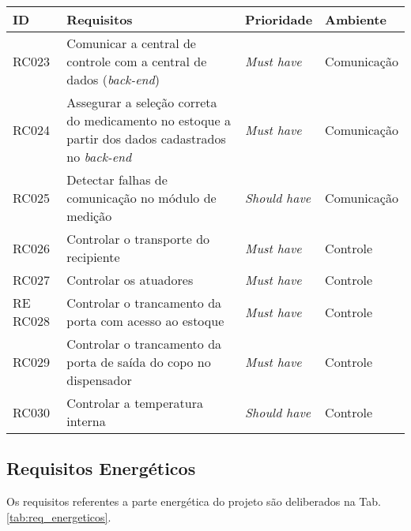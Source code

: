 \begin{table}[H]
    \centering
	\begin{adjustbox}{max width = \textwidth}
        \begin{tabular}{|L{1.5cm}|L{8.5cm}|C{2.5cm}|C{3.5cm}|}
        \hline
        \textbf{ID} & \textbf{Requisitos} & \textbf{Prioridade} & \textbf{Ambiente} \\ \hline
        RC023 & Comunicar a  central de controle com a central de dados (\textit{back-end}) & \textit{Must have} & Comunicação\\ \hline
        RC024 & Assegurar a seleção correta do medicamento no estoque a partir dos dados cadastrados no \textit{back-end} & \textit{Must have} & Comunicação\\ \hline
        RC025 & Detectar falhas de comunicação no módulo de medição & \textit{Should have} & Comunicação\\ \hline
        RC026 & Controlar o transporte do recipiente & \textit{Must have} & Controle \\ \hline
        RC027 & Controlar os atuadores & \textit{Must have} & Controle \\ \hline
        RE
        RC028 & Controlar o trancamento da porta com acesso ao estoque & \textit{Must have} & Controle \\ \hline
        RC029 & Controlar o trancamento da porta de saída do copo no dispensador & \textit{Must have} & Controle \\ \hline
        RC030 & Controlar a temperatura interna & \textit{Should have} & Controle \\ \hline
        \end{tabular}
	\end{adjustbox}  
\end{table}

\subsection{Requisitos Energéticos}

Os requisitos referentes a parte energética do projeto são deliberados na Tab. \ref{tab:req_energeticos}.

